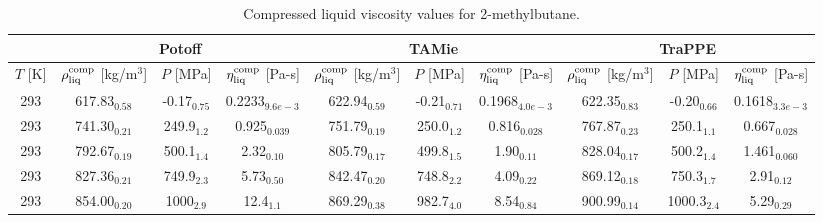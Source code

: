 \documentclass[preprint,review,12pt]{elsarticle}
\begin{document}
	\begin{table}[H]
		\caption{Compressed liquid viscosity values for 2-methylbutane.}
		\begin{center}
			\begin{tabular}{|c|c|c|c|c|c|c|c|c|c|}
				\hline
				& \multicolumn{3}{c|}{Potoff}                                                                          & \multicolumn{3}{c|}{TAMie}                                                                              & \multicolumn{3}{c|}{TraPPE}                                                                          \\ \hline
				$T$ {[}K{]} & $\rho^{\rm comp}_{\rm liq}$ {[}kg/m$^3${]} & $P$ {[}MPa{]}  & $\eta^{\rm comp}_{\rm liq}$ {[}Pa-s{]} & $\rho^{\rm comp}_{\rm liq}$ {[}kg/m$^3${]} & $P$ {[}MPa{]}     & $\eta^{\rm comp}_{\rm liq}$ {[}Pa-s{]} & $\rho^{\rm comp}_{\rm liq}$ {[}kg/m$^3${]} & $P$ {[}MPa{]}  & $\eta^{\rm comp}_{\rm liq}$ {[}Pa-s{]} \\ \hline
				293         & 617.83$_{0.58}$                            & -0.17$_{0.75}$ & 0.2233$_{9.6e-3}$                      & 622.94$_{0.59}$                         & -0.21$_{0.71}$ & 0.1968$_{4.0e-3}$                      & 622.35$_{0.83}$                         & -0.20$_{0.66}$ & 0.1618$_{3.3e-3}$                      \\ \hline
				293         & 741.30$_{0.21}$                            & 249.9$_{1.2}$  & 0.925$_{0.039}$                        & 751.79$_{0.19}$                         & 250.0$_{1.2}$  & 0.816$_{0.028}$                        & 767.87$_{0.23}$                         & 250.1$_{1.1}$  & 0.667$_{0.028}$                        \\ \hline
				293         & 792.67$_{0.19}$                            & 500.1$_{1.4}$  & 2.32$_{0.10}$                          & 805.79$_{0.17}$                         & 499.8$_{1.5}$  & 1.90$_{0.11}$                          & 828.04$_{0.17}$                         & 500.2$_{1.4}$  & 1.461$_{0.060}$                        \\ \hline
				293         & 827.36$_{0.21}$                            & 749.9$_{2.3}$  & 5.73$_{0.50}$                          & 842.47$_{0.20}$                         & 748.8$_{2.2}$  & 4.09$_{0.22}$                          & 869.12$_{0.18}$                         & 750.3$_{1.7}$  & 2.91$_{0.12}$                          \\ \hline
				293         & 854.00$_{0.20}$                            & 1000$_{2.9}$   & 12.4$_{1.1}$                           & 869.29$_{0.38}$                         & 982.7$_{4.0}$  & 8.54$_{0.84}$                          & 900.99$_{0.14}$                         & 1000.3$_{2.4}$ & 5.29$_{0.29}$                          \\ \hline
			\end{tabular}
		\end{center}
	\end{table}
\end{document}
